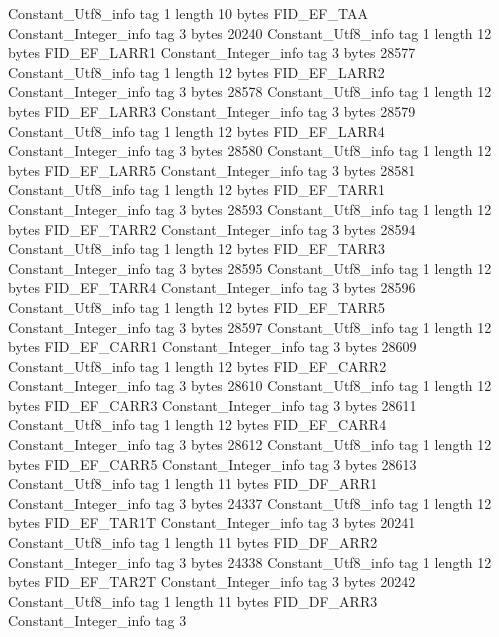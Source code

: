 {{{		}
		Constant_Utf8_info {
			tag	1
			length	10
			bytes	FID_EF_TAA
		}
		Constant_Integer_info {
			tag	3
			bytes	20240
		}
		Constant_Utf8_info {
			tag	1
			length	12
			bytes	FID_EF_LARR1
		}
		Constant_Integer_info {
			tag	3
			bytes	28577
		}
		Constant_Utf8_info {
			tag	1
			length	12
			bytes	FID_EF_LARR2
		}
		Constant_Integer_info {
			tag	3
			bytes	28578
		}
		Constant_Utf8_info {
			tag	1
			length	12
			bytes	FID_EF_LARR3
		}
		Constant_Integer_info {
			tag	3
			bytes	28579
		}
		Constant_Utf8_info {
			tag	1
			length	12
			bytes	FID_EF_LARR4
		}
		Constant_Integer_info {
			tag	3
			bytes	28580
		}
		Constant_Utf8_info {
			tag	1
			length	12
			bytes	FID_EF_LARR5
		}
		Constant_Integer_info {
			tag	3
			bytes	28581
		}
		Constant_Utf8_info {
			tag	1
			length	12
			bytes	FID_EF_TARR1
		}
		Constant_Integer_info {
			tag	3
			bytes	28593
		}
		Constant_Utf8_info {
			tag	1
			length	12
			bytes	FID_EF_TARR2
		}
		Constant_Integer_info {
			tag	3
			bytes	28594
		}
		Constant_Utf8_info {
			tag	1
			length	12
			bytes	FID_EF_TARR3
		}
		Constant_Integer_info {
			tag	3
			bytes	28595
		}
		Constant_Utf8_info {
			tag	1
			length	12
			bytes	FID_EF_TARR4
		}
		Constant_Integer_info {
			tag	3
			bytes	28596
		}
		Constant_Utf8_info {
			tag	1
			length	12
			bytes	FID_EF_TARR5
		}
		Constant_Integer_info {
			tag	3
			bytes	28597
		}
		Constant_Utf8_info {
			tag	1
			length	12
			bytes	FID_EF_CARR1
		}
		Constant_Integer_info {
			tag	3
			bytes	28609
		}
		Constant_Utf8_info {
			tag	1
			length	12
			bytes	FID_EF_CARR2
		}
		Constant_Integer_info {
			tag	3
			bytes	28610
		}
		Constant_Utf8_info {
			tag	1
			length	12
			bytes	FID_EF_CARR3
		}
		Constant_Integer_info {
			tag	3
			bytes	28611
		}
		Constant_Utf8_info {
			tag	1
			length	12
			bytes	FID_EF_CARR4
		}
		Constant_Integer_info {
			tag	3
			bytes	28612
		}
		Constant_Utf8_info {
			tag	1
			length	12
			bytes	FID_EF_CARR5
		}
		Constant_Integer_info {
			tag	3
			bytes	28613
		}
		Constant_Utf8_info {
			tag	1
			length	11
			bytes	FID_DF_ARR1
		}
		Constant_Integer_info {
			tag	3
			bytes	24337
		}
		Constant_Utf8_info {
			tag	1
			length	12
			bytes	FID_EF_TAR1T
		}
		Constant_Integer_info {
			tag	3
			bytes	20241
		}
		Constant_Utf8_info {
			tag	1
			length	11
			bytes	FID_DF_ARR2
		}
		Constant_Integer_info {
			tag	3
			bytes	24338
		}
		Constant_Utf8_info {
			tag	1
			length	12
			bytes	FID_EF_TAR2T
		}
		Constant_Integer_info {
			tag	3
			bytes	20242
		}
		Constant_Utf8_info {
			tag	1
			length	11
			bytes	FID_DF_ARR3
		}
		Constant_Integer_info {
			tag	3
}}}
